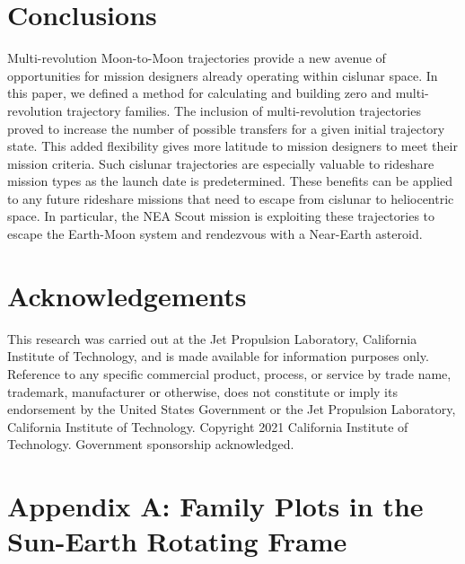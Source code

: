 \documentclass[letterpaper, paper,11pt]{AAS}	%
\begin{document}
\section*{Conclusions}
Multi-revolution Moon-to-Moon trajectories provide a new avenue of opportunities for mission designers already operating within cislunar space. In this paper, we defined a method for calculating and building zero and multi-revolution trajectory families. The inclusion of multi-revolution trajectories proved to increase the number of possible transfers for a given initial trajectory state. This added flexibility gives more latitude to mission designers to meet their mission criteria. Such cislunar trajectories are especially valuable to rideshare mission types as the launch date is predetermined. These benefits can be applied to any future rideshare missions that need to escape from cislunar to heliocentric space. In particular, the NEA Scout mission is exploiting these trajectories to escape the Earth-Moon system and rendezvous with a Near-Earth asteroid.

\section*{Acknowledgements}
This research was carried out at the Jet Propulsion Laboratory, California Institute of Technology, and is made available for information purposes only. Reference to any specific commercial
product, process, or service by trade name, trademark, manufacturer or otherwise, does not constitute or imply its endorsement by the United States Government or the Jet Propulsion Laboratory,
California Institute of Technology. Copyright 2021 California Institute of Technology. Government sponsorship acknowledged.

\appendix
\clearpage
\section*{Appendix A: Family Plots in the Sun-Earth Rotating Frame}
\label{section:appA}
\end{document}
